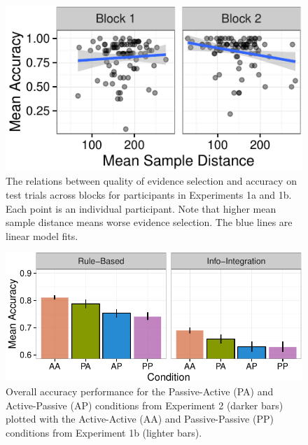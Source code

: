 \documentclass[10pt, letterpaper]{article}
\newenvironment{CodeChunk}{}{}
\begin{document}
\begin{CodeChunk}
\begin{figure}[t]

\includegraphics{figs/samp_acc_scatter_plot-1} \hfill{}

\caption[The relations between quality of evidence selection and accuracy on test trials across blocks for participants in Experiments 1a and 1b]{The relations between quality of evidence selection and accuracy on test trials across blocks for participants in Experiments 1a and 1b. Each point is an individual participant. Note that higher mean sample distance means worse evidence selection. The blue lines are linear model fits.}\label{fig:samp_acc_scatter_plot}
\end{figure}
\end{CodeChunk}

\begin{CodeChunk}
\begin{figure}[t]

{\centering \includegraphics{figs/exp2_acc_plot-1} 

}

\caption[Overall accuracy performance for the Passive-Active (PA) and Active-Passive (AP) conditions from Experiment 2 (darker bars) plotted with the Active-Active (AA) and Passive-Passive (PP) conditions from Experiment 1b (lighter bars)]{Overall accuracy performance for the Passive-Active (PA) and Active-Passive (AP) conditions from Experiment 2 (darker bars) plotted with the Active-Active (AA) and Passive-Passive (PP) conditions from Experiment 1b (lighter bars).}\label{fig:exp2_acc_plot}
\end{figure}
\end{CodeChunk}
\end{document}
